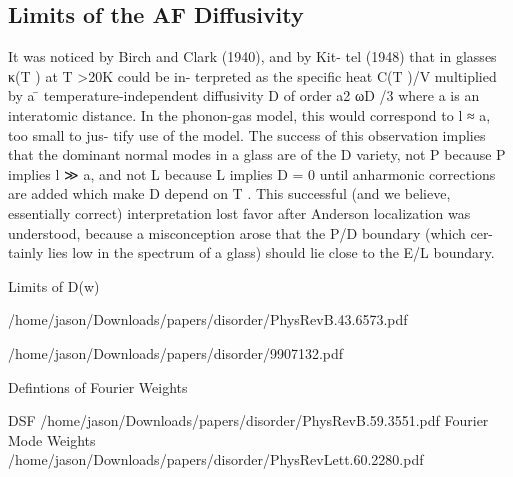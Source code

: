 \documentclass[aps,prb,preprint,superscriptaddress,amsmath,amssymb,floatfix]{revtex4}
\begin{document}
\subsection{\label{S-Motivation-Amorphous}Limits of the AF Diffusivity}

It was noticed by Birch and Clark (1940), and by Kit-
tel (1948) that in glasses κ(T ) at T >20K could be in-
terpreted as the specific heat C(T )/V multiplied by a
 ̄
temperature-independent diffusivity D of order a2 ωD /3
where a is an interatomic distance. In the phonon-gas
model, this would correspond to l ≈ a, too small to jus-
tify use of the model. The success of this observation
implies that the dominant normal modes in a glass are of
the D variety, not P because P implies l ≫ a, and not L
because L implies D = 0 until anharmonic corrections are
added which make D depend on T . This successful (and
we believe, essentially correct) interpretation lost favor
after Anderson localization was understood, because a
misconception arose that the P/D boundary (which cer-
tainly lies low in the spectrum of a glass) should lie close
to the E/L boundary.

Limits of D(w)

/home/jason/Downloads/papers/disorder/PhysRevB.43.6573.pdf


/home/jason/Downloads/papers/disorder/9907132.pdf

Defintions of Fourier Weights

DSF
/home/jason/Downloads/papers/disorder/PhysRevB.59.3551.pdf
Fourier Mode Weights
/home/jason/Downloads/papers/disorder/PhysRevLett.60.2280.pdf
\end{document}
